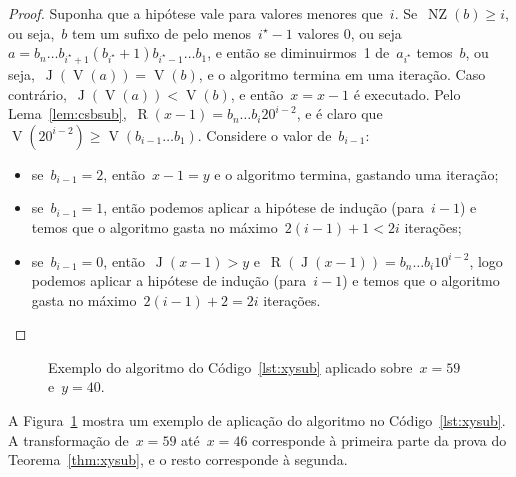 \documentclass[main.tex]{subfiles}
\newcommand{\NZ}{\operatorname{NZ}}
\renewcommand{\V}{\operatorname{V}}
\newcommand{\R}{\operatorname{R}}
\newcommand{\J}{\operatorname{J}}
\begin{document}
\begin{proof}
	Suponha que a hipótese vale para valores menores que~$i$. Se~${\NZ(b) \geq i}$, ou seja,~$b$ tem um sufixo de pelo menos~$i^\star - 1$ valores 0, ou seja~${a = b_n \ldots b_{i^\star + 1} (b_{i^\star} + 1) b_{i^\star - 1} \ldots b_1}$, e então se diminuirmos~1 de~$a_{i^\star}$ temos~$b$, ou seja,~${\J(\V(a)) = \V(b)}$, e o algoritmo termina em uma iteração.
	Caso contrário,~$\J(\V(a)) < \V(b)$, e então~$x = x - 1$ é executado. Pelo Lema~\ref{lem:csbsub},~${\R(x - 1) = b_n \ldots b_i 2 0^{i-2}}$, e é claro que~${\V(20^{i-2}) \geq \V(b_{i-1} \ldots b_1)}$. Considere o valor de~$b_{i-1}$:
	\begin{itemize}
		\item se~$b_{i-1} = 2$, então~$x - 1 = y$ e o algoritmo termina, gastando uma iteração;
		\item se~$b_{i-1} = 1$, então podemos aplicar a hipótese de indução (para~$i-1$) e temos que o algoritmo gasta no máximo~$2(i - 1) + 1 < 2i$ iterações;
		\item se~$b_{i-1} = 0$, então~$\J(x - 1) > y$ e~$\R(\J(x - 1)) = b_n \ldots b_i 1 0^{i-2}$, logo podemos aplicar a hipótese de indução (para~$i-1$) e temos que o algoritmo gasta no máximo~$2(i-1) + 2 = 2i$ iterações.
	\end{itemize}
\end{proof}

\begin{figure}
\caption{Exemplo do algoritmo do Código~\ref{lst:xysub} aplicado sobre~$x = 59$ e~$y = 40$.} \label{fig:exxysub}
\end{figure}

A Figura~\ref{fig:exxysub} mostra um exemplo de aplicação do algoritmo no Código~\ref{lst:xysub}. A transformação de~$x = 59$ até~$x = 46$ corresponde à primeira parte da prova do Teorema~\ref{thm:xysub}, e o resto corresponde à segunda.
\end{document}
